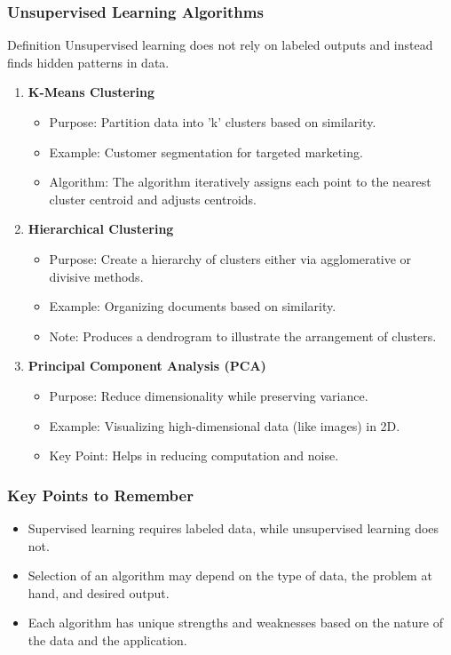 \documentclass[aspectratio=169]{beamer}
\begin{document}
\begin{frame}[fragile]
    \frametitle{Unsupervised Learning Algorithms}
    \begin{block}{Definition}
        Unsupervised learning does not rely on labeled outputs and instead finds hidden patterns in data.
    \end{block}
    
    \begin{enumerate}
        \item \textbf{K-Means Clustering}
        \begin{itemize}
            \item Purpose: Partition data into 'k' clusters based on similarity.
            \item Example: Customer segmentation for targeted marketing.
            \item Algorithm: The algorithm iteratively assigns each point to the nearest cluster centroid and adjusts centroids.
        \end{itemize}

        \item \textbf{Hierarchical Clustering}
        \begin{itemize}
            \item Purpose: Create a hierarchy of clusters either via agglomerative or divisive methods.
            \item Example: Organizing documents based on similarity.
            \item Note: Produces a dendrogram to illustrate the arrangement of clusters.
        \end{itemize}

        \item \textbf{Principal Component Analysis (PCA)}
        \begin{itemize}
            \item Purpose: Reduce dimensionality while preserving variance.
            \item Example: Visualizing high-dimensional data (like images) in 2D.
            \item Key Point: Helps in reducing computation and noise.
        \end{itemize}
    \end{enumerate}
\end{frame}

\begin{frame}[fragile]
    \frametitle{Key Points to Remember}
    \begin{itemize}
        \item Supervised learning requires labeled data, while unsupervised learning does not.
        \item Selection of an algorithm may depend on the type of data, the problem at hand, and desired output.
        \item Each algorithm has unique strengths and weaknesses based on the nature of the data and the application.
    \end{itemize}
\end{frame}
\end{document}
